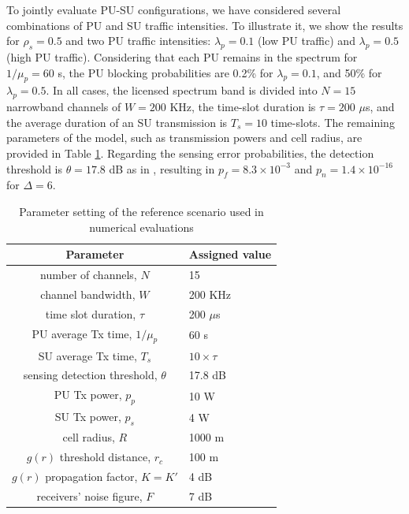 To jointly evaluate PU-SU configurations, we have considered several combinations of PU and SU traffic intensities. To illustrate it, we show the results for $\rho_{s}=0.5$ and two PU traffic intensities: $\lambda_{p}=0.1$ (low PU traffic) and $\lambda_{p}=0.5$ (high PU traffic). Considering that each PU remains in the spectrum for $1/\mu_{p}=60$ s, the PU blocking probabilities are 0.2\% for $\lambda_{p}=0.1$, and 50\% for $\lambda_{p}=0.5$.  
In all cases, the licensed spectrum band is divided into $N=15$ narrowband channels of $W=200$ KHz, the time-slot duration is $\tau=200$ $\mu$s, and the average duration of an SU transmission is $T_{s}=10$ time-slots. The remaining parameters of the model, such as transmission powers and cell radius, are provided in Table \ref{BR_table_sim_param}. 
Regarding the sensing error probabilities, the detection threshold is $\theta=17.8$ dB as in \cite{ref:comparativaMAC}, resulting in $p_{f}=8.3\times10^{-3}$ and $p_{n}=1.4\times10^{-16}$ for $\Delta=6$.

\begin{table}
\begin{tabular}{|c|l|} \hline
\textbf{Parameter} & \textbf{Assigned value}\\\hline\hline
number of channels, $N$&15\\\hline
channel bandwidth, $W$&200 KHz\\\hline
time slot duration, $\tau$&200 $\mu$s\\\hline
PU average Tx time, $1/\mu_{p}$&60 s\\\hline
SU average Tx time, $T_{s}$&$10\times\tau$\\\hline
sensing detection threshold, $\theta$&17.8 dB\\\hline
PU Tx power, $p_{p}$&10 W\\\hline
SU Tx power, $p_{s}$&4 W\\\hline
cell radius, $R$ &1000 m\\\hline
$g(r)$ threshold distance, $r_{c}$&100 m\\\hline
$g(r)$ propagation factor, $K=K'$&4 dB\\\hline
receivers' noise figure, $F$&7 dB\\\hline
\end{tabular}
\centering
\caption{Parameter setting of the reference scenario used in numerical evaluations}
\label{BR_table_sim_param}
\end{table}

